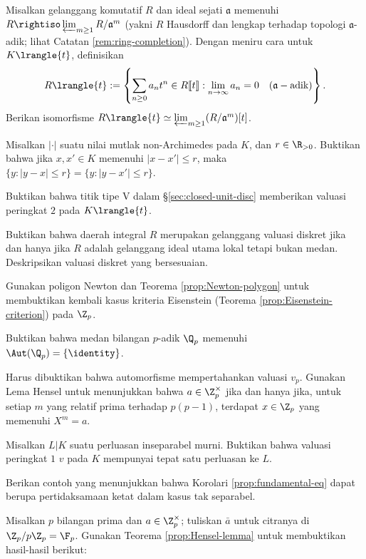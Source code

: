 \begin{Exercises}
	\item Misalkan gelanggang komutatif $R$ dan ideal sejati $\mathfrak{a}$ memenuhi $R \rightiso \varprojlim_{m \geq 1} R/\mathfrak{a}^m$ (yakni $R$ Hausdorff dan lengkap terhadap topologi $\mathfrak{a}$-adik; lihat Catatan \ref{rem:ring-completion}). Dengan meniru cara untuk $K\lrangle{t}$, definisikan
		\[ R\lrangle{t} := \left\{ \sum_{n \geq 0} a_n t^n \in R\llbracket t \rrbracket: \lim_{n \to \infty} a_n = 0 \quad (\mathfrak{a}-\text{adik}) \right\}. \]
		Berikan isomorfisme $R\lrangle{t} \simeq \varprojlim_{m \geq 1} (R/\mathfrak{a}^m)[t]$.
	\item Misalkan $|\cdot|$ suatu nilai mutlak non-Archimedes pada $K$, dan $r \in \R_{>0}$. Buktikan bahwa jika $x,x' \in K$ memenuhi $|x-x'| \leq r$, maka $\{y: |y-x| \leq r \} = \{y: |y-x'| \leq r \}$.
	\item Buktikan bahwa titik tipe V dalam \S\ref{sec:closed-unit-disc} memberikan valuasi peringkat $2$ pada $K\lrangle{t}$.
	\item Buktikan bahwa daerah integral $R$ merupakan gelanggang valuasi diskret jika dan hanya jika $R$ adalah gelanggang ideal utama lokal tetapi bukan medan. Deskripsikan valuasi diskret yang bersesuaian. 
	\item Gunakan poligon Newton dan Teorema \ref{prop:Newton-polygon} untuk membuktikan kembali kasus kriteria Eisenstein (Teorema \ref{prop:Eisenstein-criterion}) pada $\Z_p$.
	\item Buktikan bahwa medan bilangan $p$-adik $\Q_p$ memenuhi $\Aut(\Q_p) = \{\identity\}$.
	\begin{hint}
		Harus dibuktikan bahwa automorfisme mempertahankan valuasi $v_p$. Gunakan Lema Hensel untuk menunjukkan bahwa $a \in \Z_p^\times$ jika dan hanya jika, untuk setiap $m$ yang relatif prima terhadap $p(p-1)$, terdapat $x \in \Z_p$ yang memenuhi $X^m=a$.
	\end{hint}
	\item Misalkan $L|K$ suatu perluasan inseparabel murni. Buktikan bahwa valuasi peringkat $1$ $v$ pada $K$ mempunyai tepat satu perluasan ke $L$.
	\item Berikan contoh yang menunjukkan bahwa Korolari \ref{prop:fundamental-eq} dapat berupa pertidaksamaan ketat dalam kasus tak separabel.
	\item Misalkan $p$ bilangan prima dan $a \in \Z_p^\times$; tuliskan $\bar{a}$ untuk citranya di $\Z_p/p\Z_p = \F_p$. Gunakan Teorema \ref{prop:Hensel-lemma} untuk membuktikan hasil-hasil berikut:
		\begin{enumerate}[(i)]

\end{enumerate}
\end{Exercises}
